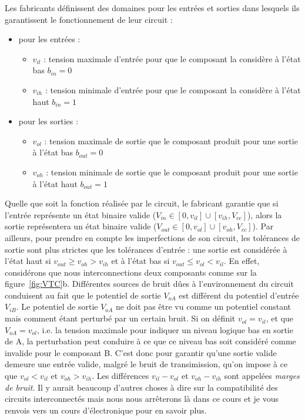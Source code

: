 Les fabricants définissent des domaines pour les entrées et sorties dans lesquels ils garantissent le fonctionnement de leur circuit :
\begin{itemize}
\item pour les entrées :
\begin{itemize}
\item $v_{il}$ : tension maximale d'entrée pour que le composant la considère à l'état bas $b_{in} = 0$
\item $v_{ih}$ : tension minimale d'entrée pour que le composant la considère à l'état haut $b_{in} = 1$
\end{itemize}
\item pour les sorties :
\begin{itemize}
\item $v_{ol}$ : tension maximale de sortie que le composant produit pour une sortie à l'état bas $b_{out} = 0$
\item $v_{oh}$ : tension minimale de sortie que le composant produit pour une sortie à l'état haut $b_{out} = 1$
\end{itemize}
\end{itemize}



Quelle que soit la fonction réalisée par le circuit, le fabricant garantie que si l'entrée représente un état binaire valide ($V_{in} \in [0, v_{il}] \cup [v_{ih}, V_{cc}]$), alors la sortie représentera un état binaire valide ($V_{out} \in [0, v_{ol}] \cup [v_{oh}, V_{cc}]$). Par ailleurs, pour prendre en compte les imperfections de son circuit, les tolérances de sortie sont plus strictes que les tolérances d'entrée : une sortie est considérée à l'état haut si $v_{out} \geq v_{oh} > v_{ih}$ et à l'état bas si $v_{out} \leq v_{ol} < v_{il}$. En effet, considérons que nous interconnections deux composants comme sur la figure~\ref{fig:VTC}b. Différentes sources de bruit dûes à l'environnement du circuit conduisent au fait que le potentiel de sortie $V_{oA}$ est différent du potentiel d'entrée $V_{iB}$. Le potentiel de sortie $V_{oA}$ ne doit pas être vu comme un potentiel constant mais comment étant perturbé par un certain bruit. Si on définit $v_{ol} = v_{il}$, et que $V_{oA} = v_{ol}$, i.e. la tension maximale pour indiquer un niveau logique bas en sortie de A, la perturbation peut conduire à ce que ce niveau bas soit considéré comme invalide pour le composant B. C'est donc pour garantir qu'une sortie valide demeure une entrée valide, malgré le bruit de transimission, qu'on impose à ce que $v_{ol} < v_{il}$ et $v_{oh} > v_{ih}$. Les différences $v_{il} - v_{ol}$ et $v_{oh} - v_{ih}$ sont appelées \emph{marges de bruit}. Il y aurait beaucoup d'autres choses à dire sur la compatibilité des circuits interconnectés mais nous nous arrêterons là dans ce cours et je vous renvois vers un cours d'électronique pour en savoir plus. 

